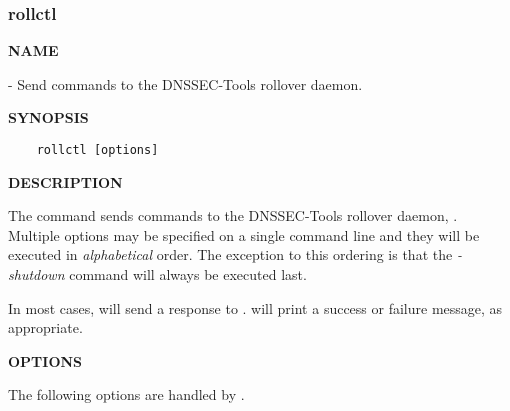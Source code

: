\clearpage

\subsubsection{\bf rollctl}

{\bf NAME}

 - Send commands to the DNSSEC-Tools rollover daemon.

{\bf SYNOPSIS}

\begin{verbatim}
    rollctl [options]
\end{verbatim}

{\bf DESCRIPTION}

The  command sends commands to the DNSSEC-Tools rollover daemon,
.  Multiple options may be specified on a single command line and
they will be executed in {\it alphabetical} order.  The exception to this
ordering is that the {\it -shutdown} command will always be executed last.

In most cases,  will send a response to .
 will print a success or failure message, as appropriate.

{\bf OPTIONS}

The following options are handled by .


